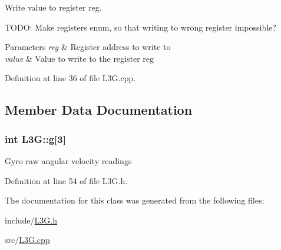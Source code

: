 \-Write value to register reg. 

\-T\-O\-D\-O\-: \-Make registers enum, so that writing to wrong register impossible?


\begin{DoxyParams}{\-Parameters}
{\em reg} & \-Register address to write to \\
\hline
{\em value} & \-Value to write to the register reg \\
\hline
\end{DoxyParams}


\-Definition at line 36 of file \-L3\-G.\-cpp.



\subsection{\-Member \-Data \-Documentation}
\hypertarget{class_l3_g_a0cb874e50a2ea4753d81e9a46c7e45ce}{
\subsubsection[{g}]{\setlength{\rightskip}{0pt plus 5cm}int {\bf \-L3\-G\-::g}\mbox{[}3\mbox{]}}}\label{class_l3_g_a0cb874e50a2ea4753d81e9a46c7e45ce}
\-Gyro raw angular velocity readings 

\-Definition at line 54 of file \-L3\-G.\-h.



\-The documentation for this class was generated from the following files\-:\begin{DoxyCompactItemize}
\item 
include/\hyperlink{_l3_g_8h}{\-L3\-G.\-h}\item 
src/\hyperlink{_l3_g_8cpp}{\-L3\-G.\-cpp}\end{DoxyCompactItemize}
